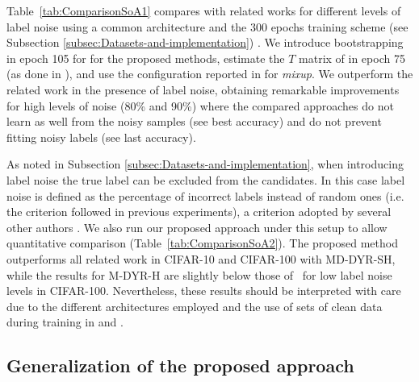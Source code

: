 \documentclass{article}
\begin{document}
Table~\ref{tab:ComparisonSoA1} compares with related works for different levels of label noise using a common architecture and the 300 epochs training scheme (see
Subsection \ref{subsec:Datasets-and-implementation}) .
We introduce bootstrapping in epoch 105 for \cite{2015_ICLR_Bootstrapping}
for the proposed methods, estimate the $T$ matrix of \cite{2017_CVPR_ForwardLoss}
in epoch 75 (as done in \cite{2018_NIPS_GoldLoss}), and use the configuration reported in \cite{2018_ICLR_mixup} for \emph{mixup}. We outperform the
related work in the presence of label noise, obtaining remarkable improvements
for high levels of noise (80\% and 90\%) where the compared
approaches do not learn as well from the noisy samples (see best accuracy)
and do not prevent fitting noisy labels (see last accuracy).

As noted in Subsection \ref{subsec:Datasets-and-implementation},
when introducing label noise the true label can be excluded from the
candidates. In this case label noise is defined as the percentage of incorrect labels
instead of random ones (i.e. the criterion followed in previous experiments), a criterion adopted by several other authors \cite{2018_ICML_MentorNet,2018_ICML_DimDriven,2018_ICML_L2ReweightNoise,2018_CVPR_IterativeNoise}. We also run our proposed approach under this setup to allow  quantitative comparison (Table~\ref{tab:ComparisonSoA2}). The proposed method outperforms all related work in CIFAR-10 and CIFAR-100 with MD-DYR-SH,
while the results for M-DYR-H are slightly below those of~\cite{2018_ICML_MentorNet}
for low label noise levels in CIFAR-100. Nevertheless, these results should be interpreted with care due to the different architectures employed and
the use of sets of clean data during training in \cite{2018_ICML_MentorNet}
and \cite{2018_ICML_L2ReweightNoise}.

\subsection{Generalization of the proposed approach\label{subsec:Additional datasets}}
\end{document}

